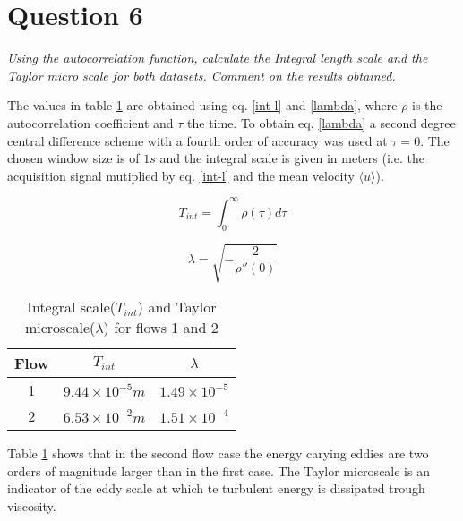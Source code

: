 \section*{Question 6}
\textit{Using the autocorrelation function, calculate the Integral length scale and the Taylor micro scale for both datasets. Comment on the results obtained.}

The values in table \ref{scales} are obtained using eq. \eqref{int-l} and \eqref{lambda}, where $\rho$ is the autocorrelation coefficient and $\tau$ the time. To obtain eq. \eqref{lambda} a second degree central difference scheme with a fourth order of accuracy was used at $\tau = 0$. The chosen window size is of $1s$ and the integral scale is given in meters (i.e. the acquisition signal mutiplied by eq. \eqref{int-l} and the mean velocity $\langle u \rangle$).

\begin{equation}\label{int-l}
T_{int} = \int_0^{\infty} \rho (\tau) d\tau
\end{equation}

\begin{equation}\label{lambda}
\lambda = \sqrt{- \frac{2}{\rho''(0)}}
\end{equation}

\begin{table}[!ht]
\centering
\caption{Integral scale($T_{int}$) and Taylor microscale($\lambda$) for flows 1 and 2}
\label{scales}
\begin{tabular}{c|c|c}
Flow & $T_{int}$ & $\lambda$ \\
\hline
1 & $9.44 \times 10^{-5}m$ & $1.49 \times 10^{-5}$\\
2 & $6.53 \times 10^{-2}m$ & $1.51 \times 10^{-4}$
\end{tabular}
\end{table}

Table \ref{scales} shows that in the second flow case the energy carying eddies are two orders of magnitude larger than in the first case. The Taylor microscale is an indicator of the eddy scale at which te turbulent energy is dissipated trough viscosity.